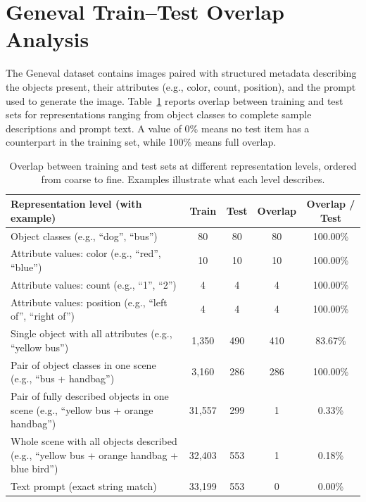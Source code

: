 \documentclass{article} %
\begin{document}
\section{Geneval Train--Test Overlap Analysis}

The Geneval dataset contains images paired with structured metadata describing the objects present, their attributes (e.g., color, count, position), and the prompt used to generate the image. Table~\ref{tab:overlap-summary} reports overlap between training and test sets for representations ranging from object classes to complete sample descriptions and prompt text. A value of 0\% means no test item has a counterpart in the training set, while 100\% means full overlap.

\begin{table}[t]
\centering
\caption{Overlap between training and test sets at different representation levels, ordered from coarse to fine. Examples illustrate what each level describes.}
\label{tab:overlap-summary}
\begin{tabular}{p{7.2cm}cccc}
\toprule
\textbf{Representation level (with example)} & \textbf{Train} & \textbf{Test} & \textbf{Overlap} & \textbf{Overlap / Test} \\
\midrule
Object classes (e.g., ``dog'', ``bus'') & 80 & 80 & 80 & 100.00\% \\
Attribute values: color (e.g., ``red'', ``blue'') & 10 & 10 & 10 & 100.00\% \\
Attribute values: count (e.g., ``1'', ``2'') & 4 & 4 & 4 & 100.00\% \\
Attribute values: position (e.g., ``left of'', ``right of'') & 4 & 4 & 4 & 100.00\% \\
Single object with all attributes (e.g., ``yellow bus'') & 1{,}350 & 490 & 410 & 83.67\% \\
Pair of object classes in one scene (e.g., ``bus + handbag'') & 3{,}160 & 286 & 286 & 100.00\% \\
Pair of fully described objects in one scene (e.g., ``yellow bus + orange handbag'') & 31{,}557 & 299 & 1 & 0.33\% \\
Whole scene with all objects described (e.g., ``yellow bus + orange handbag + blue bird'') & 32{,}403 & 553 & 1 & 0.18\% \\
Text prompt (exact string match) & 33{,}199 & 553 & 0 & 0.00\% \\
\bottomrule
\end{tabular}
\end{table}
\end{document}
